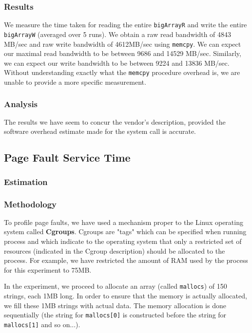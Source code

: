 \subsubsection{Results}


We measure the time taken for reading the entire \texttt{bigArrayR} and write the entire \texttt{bigArrayW} (averaged over 5 runs). 
We obtain a raw read bandwidth of 4843 MB/sec and raw write bandwidth of 4612MB/sec using \texttt{memcpy}. We can expect our maximal read bandwidth to be between 9686 and 14529 MB/sec. Similarly, we can expect our write bandwidth to be between 9224 and 13836 MB/sec. Without understanding exactly what the \texttt{memcpy} procedure overhead is, we are unable to provide a more specific measurement.

\subsubsection{Analysis}

The results we have seem to concur the vendor's description, provided the software overhead estimate made for the  system call is accurate.

\subsection{Page Fault Service Time}

\subsubsection{Estimation}

\subsubsection{Methodology}

To profile page faults, we have used a mechanism proper to the Linux operating system called \textbf{Cgroups}. Cgroups are "tags" which can be specified when running process and which indicate to the operating system that only a restricted set of resources (indicated in the Cgroup description) should be allocated to the process. For example, we have restricted the amount of RAM used by the process for this experiment to 75MB.

In the experiment, we proceed to allocate an array (called \texttt{mallocs}) of 150 strings, each 1MB long. In order to ensure that the memory is actually allocated, we fill these 1MB strings with actual data. The memory allocation is done sequentially (the string for \texttt{mallocs[0]} is constructed before the string for \texttt{mallocs[1]} and so on...).


